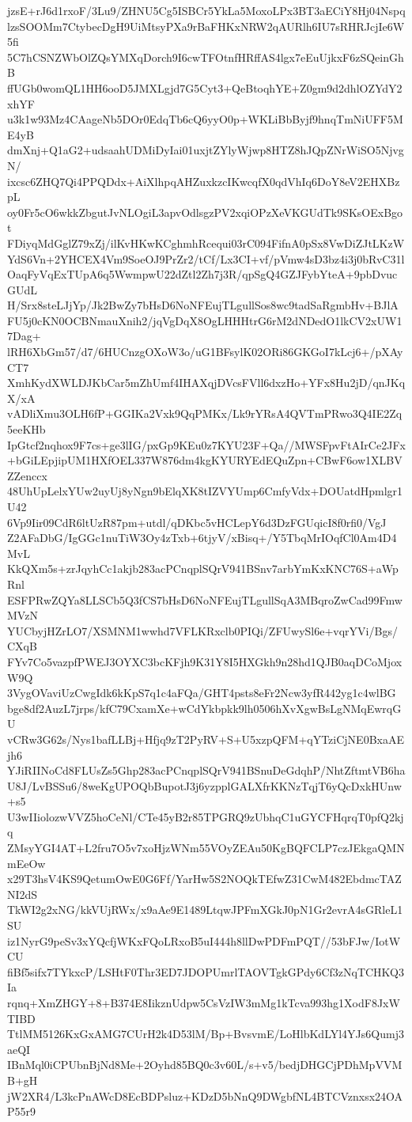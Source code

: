 jzsE+rJ6d1rxoF/3Lu9/ZHNU5Cg5ISBCr5YkLa5MoxoLPx3BT3aECiY8Hj04Nspq
lzsSOOMm7CtybecDgH9UiMtsyPXa9rBaFHKxNRW2qAURlh6IU7sRHRJcjIe6W5fi
5C7hCSNZWbOlZQsYMXqDorch9I6cwTFOtnfHRffAS4lgx7eEuUjkxF6zSQeinGhB
ffUGb0womQL1HH6ooD5JMXLgjd7G5Cyt3+QeBtoqhYE+Z0gm9d2dhlOZYdY2xhYF
u3k1w93Mz4CAageNb5DOr0EdqTb6cQ6yyO0p+WKLiBbByjf9hnqTmNiUFF5ME4yB
dmXnj+Q1aG2+udsaahUDMiDyIai01uxjtZYlyWjwp8HTZ8hJQpZNrWiSO5NjvgN/
ixcsc6ZHQ7Qi4PPQDdx+AiXlhpqAHZuxkzcIKwcqfX0qdVhIq6DoY8eV2EHXBzpL
oy0Fr5cO6wkkZbgutJvNLOgiL3apvOdlsgzPV2xqiOPzXeVKGUdTk9SKsOExBgot
FDiyqMdGglZ79xZj/ilKvHKwKCghmhRcequi03rC094FifnA0pSx8VwDiZJtLKzW
YdS6Vn+2YHCEX4Vm9SoeOJ9PrZr2/tCf/Lx3CI+vf/pVmw4sD3bz4i3j0bRvC31l
OaqFyVqExTUpA6q5WwmpwU22dZtl2Zh7j3R/qpSgQ4GZJFybYteA+9pbDvucGUdL
H/Srx8steLJjYp/Jk2BwZy7bHsD6NoNFEujTLgullSos8wc9tadSaRgmbHv+BJlA
FU5j0cKN0OCBNmauXnih2/jqVgDqX8OgLHHHtrG6rM2dNDedO1lkCV2xUW17Dag+
lRH6XbGm57/d7/6HUCnzgOXoW3o/uG1BFsylK02ORi86GKGoI7kLcj6+/pXAyCT7
XmhKydXWLDJKbCar5mZhUmf4IHAXqjDVcsFVll6dxzHo+YFx8Hu2jD/qnJKqX/xA
vADliXmu3OLH6fP+GGIKa2Vxk9QqPMKx/Lk9rYRsA4QVTmPRwo3Q4IE2Zq5eeKHb
IpGtcf2nqhox9F7cs+ge3lIG/pxGp9KEu0z7KYU23F+Qa//MWSFpvFtAIrCe2JFx
+bGiLEpjipUM1HXfOEL337W876dm4kgKYURYEdEQuZpn+CBwF6ow1XLBVZZenccx
48UhUpLelxYUw2uyUj8yNgn9bElqXK8tIZVYUmp6CmfyVdx+DOUatdHpmlgr1U42
6Vp9Iir09CdR6ltUzR87pm+utdl/qDKbc5vHCLepY6d3DzFGUqicI8f0rfi0/VgJ
Z2AFaDbG/IgGGc1nuTiW3Oy4zTxb+6tjyV/xBisq+/Y5TbqMrIOqfCl0Am4D4MvL
KkQXm5s+zrJqyhCc1akjb283acPCnqplSQrV941BSnv7arbYmKxKNC76S+aWpRnl
ESFPRwZQYa8LLSCb5Q3fCS7bHsD6NoNFEujTLgullSqA3MBqroZwCad99FmwMVzN
YUCbyjHZrLO7/XSMNM1wwhd7VFLKRxclb0PIQi/ZFUwySl6e+vqrYVi/Bgs/CXqB
FYv7Co5vazpfPWEJ3OYXC3bcKFjh9K31Y8I5HXGkh9n28hd1QJB0aqDCoMjoxW9Q
3VygOVaviUzCwgIdk6kKpS7q1c4aFQa/GHT4psts8eFr2Ncw3yfR442yg1c4wlBG
bge8df2AuzL7jrps/kfC79CxamXe+wCdYkbpkk9lh0506hXvXgwBsLgNMqEwrqGU
vCRw3G62s/Nys1bafLLBj+Hfjq9zT2PyRV+S+U5xzpQFM+qYTziCjNE0BxaAEjh6
YJiRIINoCd8FLUsZs5Ghp283acPCnqplSQrV941BSnuDeGdqhP/NhtZftmtVB6ha
U8J/LvBSSu6/8weKgUPOQbBupotJ3j6yzpplGALXfrKKNzTqjT6yQcDxkHUnw+s5
U3wIIiolozwVVZ5hoCeNl/CTe45yB2r85TPGRQ9zUbhqC1uGYCFHqrqT0pfQ2kjq
ZMsyYGI4AT+L2fru7O5v7xoHjzWNm55VOyZEAu50KgBQFCLP7czJEkgaQMNmEeOw
x29T3hsV4KS9QetumOwE0G6Ff/YarHw5S2NOQkTEfwZ31CwM482EbdmcTAZNI2dS
TkWI2g2xNG/kkVUjRWx/x9aAe9E1489LtqwJPFmXGkJ0pN1Gr2evrA4sGRleL1SU
iz1NyrG9peSv3xYQcfjWKxFQoLRxoB5uI444h8llDwPDFmPQT//53bFJw/IotWCU
fiBf5sifx7TYkxcP/LSHtF0Thr3ED7JDOPUmrlTAOVTgkGPdy6Cf3zNqTCHKQ3Ia
rqnq+XmZHGY+8+B374E8IikznUdpw5CsVzIW3mMg1kTcva993hg1XodF8JxWTIBD
TtlMM5126KxGxAMG7CUrH2k4D53lM/Bp+BvsvmE/LoHlbKdLYl4YJs6Qumj3aeQI
IBnMql0iCPUbnBjNd8Me+2Oyhd85BQ0c3v60L/s+v5/bedjDHGCjPDhMpVVMB+gH
jW2XR4/L3kcPnAWcD8EcBDPsluz+KDzD5bNnQ9DWgbfNL4BTCVznxsx24OAP55r9
